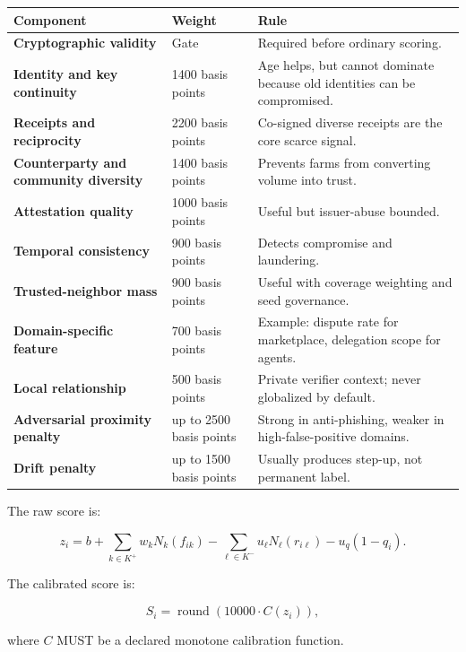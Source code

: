 \documentclass[11pt]{article}
\begin{document}
\begin{center}
\begin{tabularx}{\textwidth}{>{\bfseries}p{} p{} X}
\toprule
Component & Weight & Rule \\
\midrule
Cryptographic validity & Gate & Required before ordinary scoring. \\
Identity and key continuity & 1400 basis points & Age helps, but cannot dominate because old identities can be compromised. \\
Receipts and reciprocity & 2200 basis points & Co-signed diverse receipts are the core scarce signal. \\
Counterparty and community diversity & 1400 basis points & Prevents farms from converting volume into trust. \\
Attestation quality & 1000 basis points & Useful but issuer-abuse bounded. \\
Temporal consistency & 900 basis points & Detects compromise and laundering. \\
Trusted-neighbor mass & 900 basis points & Useful with coverage weighting and seed governance. \\
Domain-specific feature & 700 basis points & Example: dispute rate for marketplace, delegation scope for agents. \\
Local relationship & 500 basis points & Private verifier context; never globalized by default. \\
Adversarial proximity penalty & up to 2500 basis points & Strong in anti-phishing, weaker in high-false-positive domains. \\
Drift penalty & up to 1500 basis points & Usually produces step-up, not permanent label. \\
\bottomrule
\end{tabularx}
\end{center}

The raw score is:

\begin{equation}
z_i=b+\sum_{k\in K^+}w_kN_k(f_{ik})-\sum_{\ell\in K^-}u_{\ell}N_{\ell}(r_{i\ell})-u_q(1-q_i).
\end{equation}

The calibrated score is:

\begin{equation}
S_i=\operatorname{round}(10000\cdot C(z_i)),
\end{equation}

where \(C\) MUST be a declared monotone calibration function.
\end{document}
